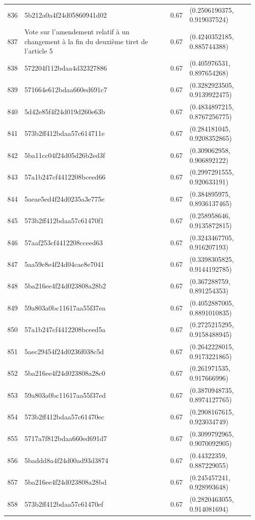 \begin{table}[ht]
\begin{tabular}{rlrl}
  836 & 5b212a0a4f24d05860941d02 & 0.67 & (0.2506190375, 0.919037524) \\ 
  837 & Vote sur l'amendement relatif à un changement à la fin du deuxième tiret de l'article 5 & 0.67 & (0.4240352185, 0.885744388) \\ 
  838 & 572204f112bdaa4d32327886 & 0.67 & (0.405976531, 0.897654268) \\ 
  839 & 571664e612bdaa660ed691c7 & 0.67 & (0.3282923505, 0.9139922475) \\ 
  840 & 5d42e85f4f24d019d260e63b & 0.67 & (0.4834897215, 0.8767256775) \\ 
  841 & 573b2ff412bdaa57c614711e & 0.67 & (0.284181045, 0.9208352865) \\ 
  842 & 5ba11cc04f24d05d26b2ed3f & 0.67 & (0.309062958, 0.906892122) \\ 
  843 & 57a1b247cf4412208bceed66 & 0.67 & (0.2997291555, 0.920633191) \\ 
  844 & 5aeae5ed4f24d0235a3e775e & 0.67 & (0.384895975, 0.8936137465) \\ 
  845 & 573b2ff412bdaa57c61470f1 & 0.67 & (0.258958646, 0.9135872815) \\ 
  846 & 57aaf253cf4412208cceed63 & 0.67 & (0.3243467705, 0.916207193) \\ 
  847 & 5aa59e8e4f24d04cae8e7041 & 0.67 & (0.3398305825, 0.9144192785) \\ 
  848 & 5ba216ee4f24d023808a28b2 & 0.67 & (0.367288759, 0.891254353) \\ 
  849 & 59a803a0bc11617aa55f37ea & 0.67 & (0.4052887005, 0.8891010835) \\ 
  850 & 57a1b247cf4412208bceed5a & 0.67 & (0.2725215295, 0.9158488945) \\ 
  851 & 5aec29454f24d0236f038c5d & 0.67 & (0.2642228015, 0.9173221865) \\ 
  852 & 5ba216ee4f24d023808a28c0 & 0.67 & (0.261971535, 0.917666996) \\ 
  853 & 59a803a0bc11617aa55f37ed & 0.67 & (0.3870948735, 0.8974127765) \\ 
  854 & 573b2ff412bdaa57c61470ec & 0.67 & (0.2908167615, 0.923034749) \\ 
  855 & 5717a7f812bdaa660ed691d7 & 0.67 & (0.3099792965, 0.9070092905) \\ 
  856 & 5baddd8a4f24d00ad93d3874 & 0.67 & (0.44322359, 0.887229055) \\ 
  857 & 5ba216ee4f24d023808a28bd & 0.67 & (0.245457241, 0.928993648) \\ 
  858 & 573b2ff412bdaa57c61470ef & 0.67 & (0.2820463055, 0.914081694) \\ 

\end{tabular}
\end{table}
